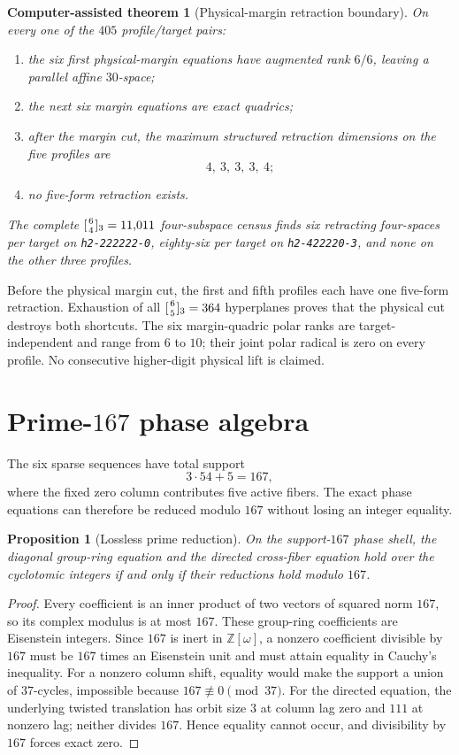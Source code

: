 \documentclass[11pt]{article}
\newtheorem{proposition}[theorem]{Proposition}
\newtheorem{computationaltheorem}[theorem]{Computer-assisted theorem}
\theoremstyle{remark}
\newcommand{\Z}{\mathbb Z}
\begin{document}
\begin{computationaltheorem}[Physical-margin retraction boundary]
\label{thm:physical-margin}
On every one of the $405$ profile/target pairs:
\begin{enumerate}
\item the six first physical-margin equations have augmented rank $6/6$,
leaving a parallel affine $30$-space;
\item the next six margin equations are exact quadrics;
\item after the margin cut, the maximum structured retraction dimensions
on the five profiles are
\[
 4,\ 3,\ 3,\ 3,\ 4;
\]
\item no five-form retraction exists.
\end{enumerate}
The complete $[{6\atop4}]_3=11{,}011$ four-subspace census finds six
retracting four-spaces per target on \texttt{h2-222222-0}, eighty-six per
target on \texttt{h2-422220-3}, and none on the other three profiles.
\end{computationaltheorem}

Before the physical margin cut, the first and fifth profiles each have one
five-form retraction.  Exhaustion of all
$[{6\atop5}]_3=364$ hyperplanes proves that the physical cut destroys both
shortcuts.  The six margin-quadric polar ranks are target-independent and
range from $6$ to $10$; their joint polar radical is zero on every profile.
No consecutive higher-digit physical lift is claimed.

\section{Prime-$167$ phase algebra}
\label{sec:prime167}

The six sparse sequences have total support
\[
 3\cdot54+5=167,
\]
where the fixed zero column contributes five active fibers.  The exact
phase equations can therefore be reduced modulo $167$ without losing an
integer equality.

\begin{proposition}[Lossless prime reduction]
\label{prop:lossless167}
On the support-$167$ phase shell, the diagonal group-ring equation and the
directed cross-fiber equation hold over the cyclotomic integers if and only
if their reductions hold modulo $167$.
\end{proposition}

\begin{proof}
Every coefficient is an inner product of two vectors of squared norm
$167$, so its complex modulus is at most $167$.  These group-ring
coefficients are Eisenstein integers.  Since $167$ is inert in
$\Z[\omega]$, a nonzero coefficient divisible by $167$ must be $167$
times an Eisenstein unit and must attain equality in Cauchy's inequality.  For a
nonzero column shift, equality would make the support a union of
$37$-cycles, impossible because $167\not\equiv0\pmod {37}$.  For the
directed equation, the underlying twisted translation has orbit size $3$
at column lag zero and $111$ at nonzero lag; neither divides $167$.
Hence equality cannot occur, and divisibility by $167$ forces exact zero.
\end{proof}
\end{document}

